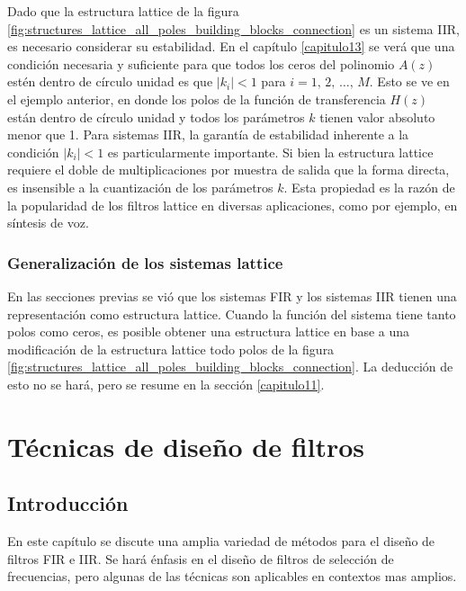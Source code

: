 \documentclass[a4paper]{report}
\begin{document}
Dado que la estructura lattice de la figura \ref{fig:structures_lattice_all_poles_building_blocks_connection} es un sistema IIR, es necesario considerar su estabilidad. En el capítulo \ref{capitulo13} se verá que una condición necesaria y suficiente para que todos los ceros del polinomio \(A(z)\) estén dentro de círculo unidad es que \(|k_i|<1\) para \(i=1,\,2,\,\dots,\,M\). Esto se ve en el ejemplo anterior, en donde los polos de la función de transferencia \(H(z)\) están dentro de círculo unidad y todos los parámetros \(k\) tienen valor absoluto menor que 1. Para sistemas IIR, la garantía de estabilidad inherente a la condición \(|k_i|<1\) es particularmente importante. Si bien la estructura lattice requiere el doble de multiplicaciones por muestra de salida que la forma directa, es insensible a la cuantización de los parámetros \(k\). Esta propiedad es la razón de la popularidad de los filtros lattice en diversas aplicaciones, como por ejemplo, en síntesis de voz.

\subsection{Generalización de los sistemas lattice}

En las secciones previas se vió que los sistemas FIR y los sistemas IIR tienen una representación como estructura lattice. Cuando la función del sistema tiene tanto polos como ceros, es posible obtener una estructura lattice en base a una modificación de la estructura lattice todo polos de la figura \ref{fig:structures_lattice_all_poles_building_blocks_connection}. La deducción de esto no se hará, pero se resume en la sección \ref{capitulo11}.





\chapter{Técnicas de diseño de filtros}\label{ch:filter_design_techniques}

\section{Introducción}

En este capítulo se discute una amplia variedad de métodos para el diseño de filtros FIR e IIR. Se hará énfasis en el diseño de filtros de selección de frecuencias, pero algunas de las técnicas son aplicables en contextos mas amplios. 
\end{document}
